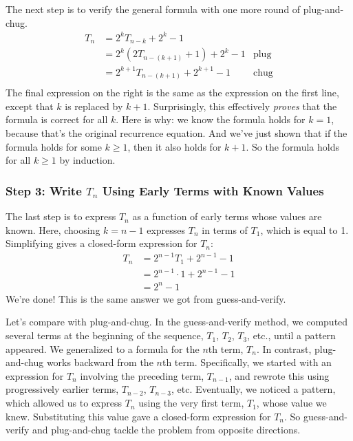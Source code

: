 The next step is to verify the general formula with one more round of plug-and-chug.
\begin{align*}
T_n & = 2^k T_{n-k} + 2^k - 1 \\
  & = 2^k (2 T_{n-(k+1)} + 1) + 2^k - 1 & \text{plug} \\
  & = 2^{k+1} T_{n-(k+1)} + 2^{k+1} - 1 & \text{chug} \\
\end{align*}
The final expression on the right is the same as the expression on the
first line, except that $k$ is replaced by $k+1$.  Surprisingly, this
effectively \emph{proves} that the formula is correct for all $k$.
Here is why: we know the formula holds for $k = 1$, because that's the
original recurrence equation.  And we've just shown that if the
formula holds for some $k \geq 1$, then it also holds for $k + 1$.  So
the formula holds for all $k \geq 1$ by induction.

\subsubsection*{Step 3: Write $T_n$ Using Early Terms with Known Values}

The last step is to express $T_n$ as a function of early terms whose
values are known.  Here, choosing $k = n - 1$ expresses $T_n$ in terms
of $T_1$, which is equal to 1.  Simplifying gives a closed-form
expression for $T_n$:
\begin{align*}
T_n & = 2^{n - 1} T_1 + 2^{n-1} - 1 \\
  & = 2^{n-1} \cdot 1 + 2^{n-1} - 1 \\
  & = 2^n -1
\end{align*}
We're done!  This is the same answer we got from guess-and-verify.

\vspace{1ex}

Let's compare  with plug-and-chug.  In the
guess-and-verify method, we computed several terms at the beginning of
the sequence, $T_1$, $T_2$, $T_3$, etc., until a pattern appeared.  We
generalized to a formula for the $n$th term, $T_n$.  In contrast,
plug-and-chug works backward from the $n$th term.  Specifically, we
started with an expression for $T_n$ involving the preceding term,
$T_{n-1}$, and rewrote this using progressively earlier terms,
$T_{n-2}$, $T_{n-3}$, etc.  Eventually, we noticed a pattern, which
allowed us to express $T_n$ using the very first term, $T_1$, whose
value we knew.  Substituting this value gave a closed-form expression
for $T_n$.  So guess-and-verify and plug-and-chug tackle the problem
from opposite directions.

